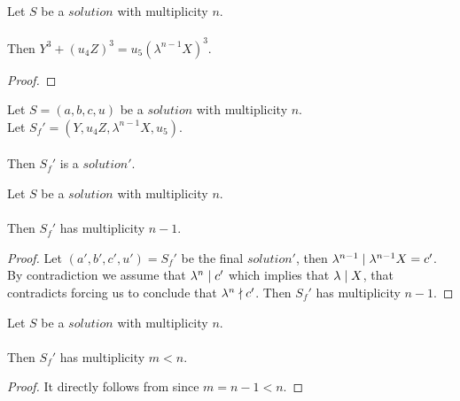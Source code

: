 \begin{lemma}
    \label{lmm:final}
    \leanok
    Let $S$ be a $solution$ with multiplicity $n$.\\\\
    Then $Y^3 + (u_4 Z)^3 = u_5 (\lambda^{n-1} X)^3$.
\end{lemma}
\begin{proof}
    \leanok
\end{proof}

\begin{definition}
    \label{def:Solution1_final}
    \leanok
    Let $S = (a,b,c,u)$ be a $solution$ with multiplicity $n$.\\
    Let $S_f' = (Y,u_4 Z, \lambda^{n-1} X, u_5)$.\\\\
    Then $S_f'$ is a $solution'$.
\end{definition}

\begin{lemma}
    \label{lmm:Solution1_final_multiplicity}
    \leanok
    Let $S$ be a $solution$ with multiplicity $n$.\\\\
    Then $S_f'$ has multiplicity $n-1$.
\end{lemma}
\begin{proof}
    \leanok
    Let $(a',b',c',u') = S_f'$ be the final $solution'$, then
    $\lambda^{n-1} \mid \lambda^{n-1} X = c'$.
    By contradiction we assume that $\lambda^n \mid c'$ which implies that $\lambda \mid X$,
    that contradicts  forcing us to conclude
    that $\lambda^{n} \nmid c'$. Then $S_f'$ has multiplicity $n-1$.
\end{proof}

\begin{lemma}
    \label{lmm:Solution1_final_multiplicity_lt}
    \leanok
    Let $S$ be a $solution$ with multiplicity $n$.\\\\
    Then $S_f'$ has multiplicity $m<n$.
\end{lemma}
\begin{proof}
    \leanok
    It directly follows from  since $m = n-1 < n$.
\end{proof}

